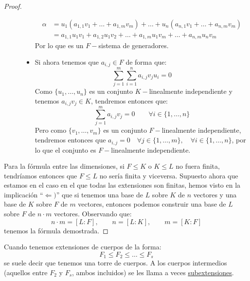 \begin{lema}[de la Torre]
\begin{proof}
\begin{description}
\begin{itemize}
                        \begin{align*}
                            \alpha &= u_1(a_{1,1}v_1 + \ldots + a_{1,m}v_m) + \ldots + u_n(a_{n,1}v_1 + \ldots + a_{n,m}v_m) \\
                                   &= a_{1,1}u_1v_1 + a_{1,2}u_1v_2 + \ldots + a_{1,m}u_1v_m + \ldots + a_{n,m}u_nv_m
                        \end{align*}
                        Por lo que es un $F-$sistema de generadores.
                    \item Si ahora tenemos que $a_{i,j}\in F$ de forma que:
                        \begin{equation*}
                            \sum_{j=1}^{m}\sum_{i=1}^{n} a_{i,j}v_ju_i = 0
                        \end{equation*}
                        Como $\{u_1,\ldots,u_n\}$ es un conjunto $K-$linealmente independiente y tenemos $a_{i,j}v_j\in K$, tendremos entonces que:
                        \begin{equation*}
                            \sum_{j=1}^{m}a_{i,j}v_j = 0 \qquad \forall i \in \{1,\ldots,n\}
                        \end{equation*}
                        Pero como $\{v_1,\ldots,v_m\}$ es un conjunto $F-$linealmente independiente, tendremos entonces que $a_{i,j} = 0 \quad \forall j \in \{1,\ldots,m\}, \quad \forall  i \in \{1,\ldots, n\}$, por lo que el conjunto es $F-$linealmente independiente.
                \end{itemize}
        \end{description}
        Para la fórmula entre las dimensiones, si $F\leq K$ o $K\leq L$ no fuera finita, tendríamos entonces que $F\leq L$ no sería finita y viceversa. Supuesto ahora que estamos en el caso en el que todas las extensiones son finitas, hemos visto en la implicación ``$\Longleftarrow )$'' que si tenemos una base de $L$ sobre $K$ de $n$ vectores y una base de $K$ sobre $F$ de $m$ vectores, entonces podemos construir una base de $L$ sobre $F$ de $n\cdot m$ vectores. Observando que:
        \begin{equation*}
            n\cdot m = [L:F], \qquad n = [L:K], \qquad m = [K:F]
        \end{equation*}
        tenemos la fórmula demostrada.
    \end{proof}
\end{lema}

\begin{notacion}
    Cuando tenemos extensiones de cuerpos de la forma:
    \begin{equation*}
        F_1 \leq F_2 \leq \ldots \leq F_s
    \end{equation*}
    se suele decir que tenemos una torre de cuerpos. A los cuerpos intermedios (aquellos entre $F_2$ y $F_s$, ambos incluidos) se les llama a veces \underline{subextensiones}.
\end{notacion}


